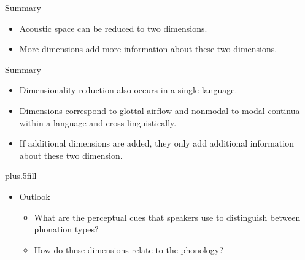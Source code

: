 \documentclass{beamer}
\begin{document}
\begin{frame}{Summary}
  \begin{itemize}
    \item Acoustic space can be reduced to two dimensions.
    \item More dimensions add more information about these two dimensions.
  \end{itemize}
  \begin{figure}[h!]
    \centering
\end{figure}
\end{frame}

\begin{frame}{Summary}

  \begin{itemize}
  \item Dimensionality reduction also occurs in a single language.
  \item Dimensions correspond to glottal-airflow and nonmodal-to-modal continua within a language and cross-linguistically.
  \item If additional dimensions are added, they only add additional information about these two dimension.
  \end{itemize}
  
  \vskip0pt plus.5fill
  \begin{itemize}
  \item
    Outlook
    \begin{itemize}
    \item What are the perceptual cues that speakers use to distinguish between phonation types?
    \item How do these dimensions relate to the phonology?
    \end{itemize}
  \end{itemize}
\end{frame}
\end{document}
